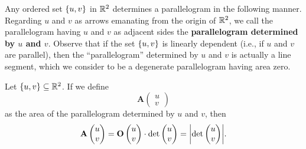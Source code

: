 \begin{defn}\label{4.1.3}
  Any ordered set \(\left\lbrace u, v\right\rbrace\) in \(\mathbb{R}^2\) determines a parallelogram in the following manner.
  Regarding \(u\) and \(v\) as arrows emanating from the origin of \(\mathbb{R}^2\), we call the parallelogram having \(u\) and \(v\) as adjacent sides the \textbf{parallelogram determined by \(u\) and \(v\)}.
  Observe that if the set \(\left\lbrace u, v\right\rbrace\) is linearly dependent (i.e., if \(u\) and \(v\) are parallel), then the ``parallelogram'' determined by \(u\) and \(v\) is actually a line segment, which we consider to be a degenerate parallelogram having area zero.
\end{defn}

\begin{prop}\label{4.1.4}
  Let \(\left\lbrace u, v\right\rbrace \subseteq \mathbb{R}^2\).
  If we define
  \[
    \mathbf{A}\begin{pmatrix}
      u \\
      v
    \end{pmatrix}
  \]
  as the area of the parallelogram determined by \(u\) and \(v\), then
  \[
    \mathbf{A}\begin{pmatrix}
      u \\
      v
    \end{pmatrix} = \mathbf{O}\begin{pmatrix}
      u \\
      v
    \end{pmatrix} \cdot \det\begin{pmatrix}
      u \\
      v
    \end{pmatrix} = \abs{\det\begin{pmatrix}
        u \\
        v
      \end{pmatrix}}.
  \]
\end{prop}

